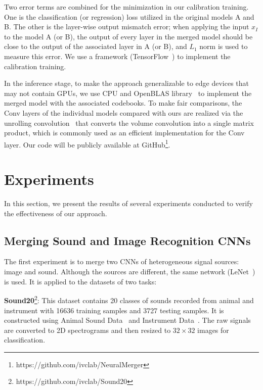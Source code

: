 \documentclass{article}
\begin{document}
	Two error terms are combined for the minimization in our calibration training.
	One is the classification (or regression) loss utilized in the original models A and B.
	The other is the layer-wise output mismatch error; %
	when applying the input $x_I$ to the model A (or B), the output of every layer in the merged model should be close to the output of the associated layer in A (or B), and $L_1$ norm is used to measure this error.
	We use a framework (TensorFlow~\cite{abadi2016tensorflow}) to implement the calibration training. %
	
	In the inference stage, to make the approach generalizable to edge devices that may not contain GPUs, we use CPU and OpenBLAS library~\cite{xianyi2012model,wang2013augem} to implement the merged model with the associated codebooks.
	To make fair comparisons, the Conv layers of the individual models compared with ours are realized via the unrolling convolution~\cite{chellapilla2006high,anwar2017structured} that converts the volume convolution into a single matrix product, which is commonly used as an efficient implementation for the Conv layer. Our code will be publicly available at GitHub\footnote{https://github.com/ivclab/NeuralMerger}.
	
	\section{Experiments}
	
	In this section, we present the results of several experiments conducted to verify the effectiveness of our approach.
	
	\subsection*{Merging Sound and Image Recognition CNNs}
	
	The first experiment is to merge two CNNs of heterogeneous signal sources: image and sound.
	Although the sources are different, the same network (LeNet~\cite{LeCun98}) is used.
	It is applied to the datasets of two tasks:
	
	\noindent \textbf{Sound20}\footnote{https://github.com/ivclab/Sound20}: This dataset contains 20 classes of sounds recorded from animal and instrument with 16636 training samples and 3727 testing samples. It is constructed using Animal Sound Data~\cite{keoghmonitoring} and Instrument Data~\cite{Juliani16}.
	The raw signals are converted to 2D spectrograms and then resized to $32\times32$ images for classification. %
	
\end{document}
